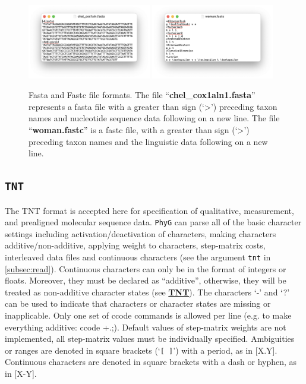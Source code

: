 \documentclass[11pt]{book}
\newcommand{\phyg}{\texttt{PhyG} }
\begin{document}
{{		\begin{figure}[H]
		\centering
		\includegraphics[width=0.48\textwidth]{fasta.png}
		\includegraphics[width=0.48\textwidth]{fastc.png}
		\caption{Fasta and Fastc file formats. The file ``\textbf{chel\_cox1aln1.fasta}'' 
		represents a fasta file with a greater than sign (`>') preceding taxon names and nucleotide  
		sequence data following on a new line. The file ``\textbf{woman.fastc}'' is a fastc 
		file, with a greater than sign (`>') preceding taxon names and the linguistic data following 
		on a new line.}
		\label{fasta-c}
		\end{figure}
		
	\subsection{\texttt{TNT}}
	\label{subsec:TNT}
		The TNT \citep{Goloboffetal2008} format is accepted here for specification of 
		qualitative, measurement, and prealigned molecular sequence data. \phyg can 
		parse all of the basic character settings including activation/deactivation of 
		characters, making characters additive/non-additive, applying weight to characters, 
		step-matrix costs, interleaved data files and continuous characters (see the 
		argument \texttt{tnt} in \ref{subsec:read}). Continuous characters can only be 
		in the format of integers or floats. Moreover, they must be declared as ``additive'', 
		otherwise, they will be treated as non-additive character states (see 
		\href{http://phylo.wikidot.com/tnt-htm}{\textbf{TNT}}).
		The characters `-' and `?' can be used to indicate that characters or character 
		states are missing or inapplicable. Only one set of ccode commands is allowed 
		per line (e.g. to make everything additive: ccode +.;). Default values of step-matrix 
		weights are not implemented, all step-matrix values must be individually specified. 
		Ambiguities or ranges are denoted in square brackets (`\texttt{[ ]}') with a period, 
		as in [X.Y]. Continuous characters are denoted in square brackets with a dash or 
		hyphen, as in [X-Y].

}}
\end{document}
